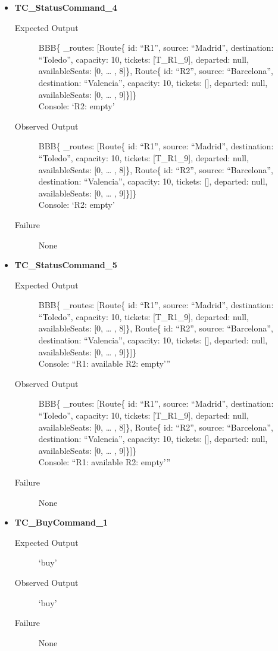 \documentclass[11pt]{article}
\begin{document}
\begin{itemize}
\item \textbf{TC\_StatusCommand\_4}
\begin{description}
\item[{Expected Output}] BBB\{ \_routes: [Route\{ id: “R1”, source: “Madrid”, destination: “Toledo”, capacity: 10,  tickets: [T\_R1\_9], departed: null, availableSeats: [0, … , 8]\}, Route\{ id: “R2”, source: “Barcelona”, destination: “Valencia”, capacity: 10,  tickets: [], departed: null, availableSeats: [0, … , 9]\}]\}\\
Console: ‘R2: empty’
\item[{Observed Output}] BBB\{ \_routes: [Route\{ id: “R1”, source: “Madrid”, destination: “Toledo”, capacity: 10,  tickets: [T\_R1\_9], departed: null, availableSeats: [0, … , 8]\}, Route\{ id: “R2”, source: “Barcelona”, destination: “Valencia”, capacity: 10,  tickets: [], departed: null, availableSeats: [0, … , 9]\}]\}\\
Console: ‘R2: empty’
\item[{Failure}] None
\end{description}

\item \textbf{TC\_StatusCommand\_5}
\begin{description}
\item[{Expected Output}] BBB\{ \_routes: [Route\{ id: “R1”, source: “Madrid”, destination: “Toledo”, capacity: 10,  tickets: [T\_R1\_9], departed: null, availableSeats: [0, … , 8]\}, Route\{ id: “R2”, source: “Barcelona”, destination: “Valencia”, capacity: 10,  tickets: [], departed: null, availableSeats: [0, … , 9]\}]\}\\
Console: “R1: available
          R2: empty’”
\item[{Observed Output}] BBB\{ \_routes: [Route\{ id: “R1”, source: “Madrid”, destination: “Toledo”, capacity: 10,  tickets: [T\_R1\_9], departed: null, availableSeats: [0, … , 8]\}, Route\{ id: “R2”, source: “Barcelona”, destination: “Valencia”, capacity: 10,  tickets: [], departed: null, availableSeats: [0, … , 9]\}]\}\\
Console: “R1: available
          R2: empty’”
\item[{Failure}] None
\end{description}

\item \textbf{TC\_BuyCommand\_1}
\begin{description}
\item[{Expected Output}] ‘buy’
\item[{Observed Output}] ‘buy’
\item[{Failure}] None
\end{description}


\end{itemize}
\end{document}
